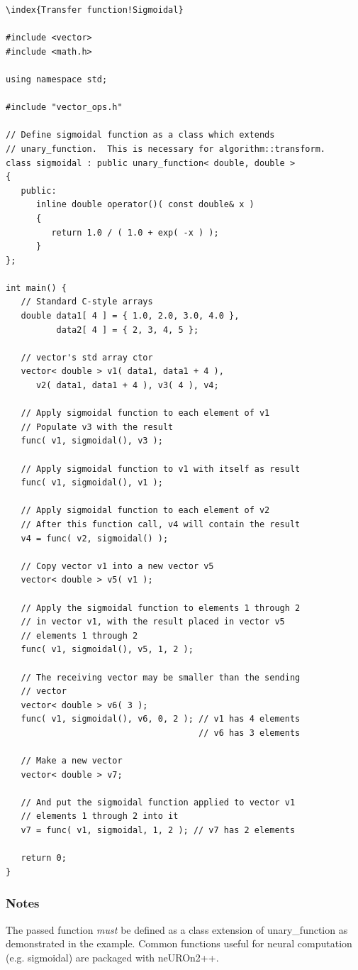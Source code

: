 \documentclass{report}
\begin{document}
\begin{verbatim}\index{Transfer function!Sigmoidal}

#include <vector>
#include <math.h>

using namespace std;

#include "vector_ops.h"

// Define sigmoidal function as a class which extends
// unary_function.  This is necessary for algorithm::transform.
class sigmoidal : public unary_function< double, double >
{
   public:
      inline double operator()( const double& x )
      {
         return 1.0 / ( 1.0 + exp( -x ) );
      }
};

int main() {
   // Standard C-style arrays
   double data1[ 4 ] = { 1.0, 2.0, 3.0, 4.0 },
          data2[ 4 ] = { 2, 3, 4, 5 };

   // vector's std array ctor
   vector< double > v1( data1, data1 + 4 ),
      v2( data1, data1 + 4 ), v3( 4 ), v4;

   // Apply sigmoidal function to each element of v1
   // Populate v3 with the result
   func( v1, sigmoidal(), v3 );

   // Apply sigmoidal function to v1 with itself as result
   func( v1, sigmoidal(), v1 );

   // Apply sigmoidal function to each element of v2
   // After this function call, v4 will contain the result
   v4 = func( v2, sigmoidal() );

   // Copy vector v1 into a new vector v5
   vector< double > v5( v1 );

   // Apply the sigmoidal function to elements 1 through 2
   // in vector v1, with the result placed in vector v5
   // elements 1 through 2
   func( v1, sigmoidal(), v5, 1, 2 );

   // The receiving vector may be smaller than the sending
   // vector
   vector< double > v6( 3 );
   func( v1, sigmoidal(), v6, 0, 2 ); // v1 has 4 elements
                                      // v6 has 3 elements

   // Make a new vector
   vector< double > v7;

   // And put the sigmoidal function applied to vector v1
   // elements 1 through 2 into it
   v7 = func( v1, sigmoidal, 1, 2 ); // v7 has 2 elements

   return 0;
}
\end{verbatim}

\subsubsection{Notes}
The passed function {\em must} be defined as a class extension of
unary\_function as demonstrated in the example.  Common functions
useful for neural computation (e.g. sigmoidal) are packaged with
neUROn2++.
\end{document}
